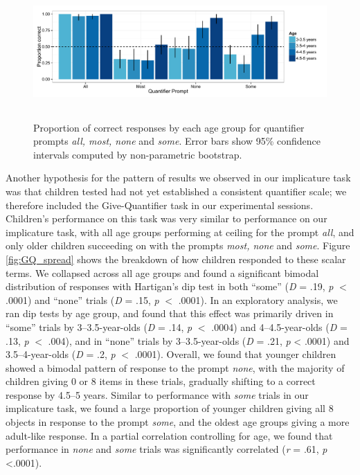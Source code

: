 \documentclass[man]{apa2}
\begin{document}
\begin{figure} 
 \begin{center} 
  \includegraphics[height=2in]{figures/exp3_GQright.pdf} 
  \caption{\label{fig:exp3_GQright} Proportion of correct responses by each age group for quantifier prompts \textit{all, most, none} and \textit{some}.  Error bars show 95\% confidence intervals computed by non-parametric bootstrap.} 
 \end{center} 
\end{figure}

Another hypothesis for the pattern of results we observed in our implicature task was that children tested had not yet established a consistent quantifier scale; we therefore included the Give-Quantifier task in our experimental sessions. Children's performance on this task was very similar to performance on our implicature task, with all age groups performing at ceiling for the prompt \textit{all}, and only older children succeeding on with the prompts \textit{most, none} and \textit{some}. Figure \ref{fig:GQ_spread} shows the breakdown of how children responded to these scalar terms. We collapsed across all age groups and found a significant bimodal distribution of responses with Hartigan's dip test in both ``some'' (\emph{D} = .19, \emph{p} $<$ .0001) and ``none'' trials (\emph{D} = .15, \emph{p} $<$ .0001).  In an exploratory analysis, we ran dip tests by age group, and found that this effect was primarily driven in ``some'' trials by 3--3.5-year-olds (\emph{D} = .14, \emph{p} $<$ .0004) and 4--4.5-year-olds (\emph{D} = .13, \emph{p} $<$ .004), and in ``none'' trials by 3--3.5-year-olds (\emph{D} = .21, \emph{p} < .0001) and 3.5--4-year-olds (\emph{D} = .2, \emph{p} $<$ .0001).  Overall, we found that younger children showed a bimodal pattern of response to the prompt \textit{none}, with the majority of children giving 0 or 8 items in these trials, gradually shifting to a correct response by 4.5--5 years. Similar to performance with \textit{some} trials in our implicature task, we found a large proportion of younger children giving all 8 objects in response to the prompt \textit{some}, and the oldest age groups giving a more adult-like response. In a partial correlation controlling for age, we found that performance in \emph{none} and \emph{some} trials was significantly correlated (\textit{r} = .61, \textit{p} \textless .0001). 
\end{document}

